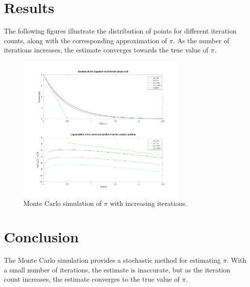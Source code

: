 \section*{Results}
The following figures illustrate the distribution of points for different iteration counts, along with the corresponding approximation of $\pi$. As the number of iterations increases, the estimate converges towards the true value of $\pi$.

\begin{figure}[h!]
  \centering

    \includegraphics[width=0.75\textwidth]{a1.jpg}
    \caption{Monte Carlo simulation of $\pi$ with increasing iterations.}
\end{figure}

\section*{Conclusion}
The Monte Carlo simulation provides a stochastic method for estimating $\pi$. With a small number of iterations, the estimate is inaccurate, but as the iteration count increases, the estimate converges to the true value of $\pi$.
